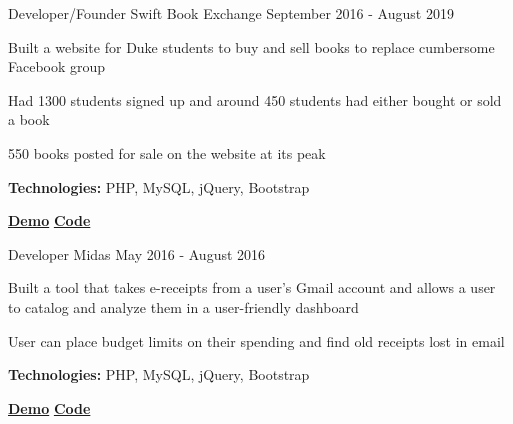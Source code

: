 
\begin{cventries}

  \cventry
    {Developer/Founder} %
    {Swift Book Exchange} %
    {} %
    {September 2016 - August 2019} %
    {
      \begin{cvitems} %
      	\item {Built a website for Duke students to buy and sell books to replace cumbersome Facebook group}
		\item {Had 1300 students signed up and around 450 students had either bought or sold a book}
		\item {550 books posted for sale on the website at its peak}
		{\setlength \itemindent{-2ex} \itemsep2pt \item[] \textbf{Technologies:} PHP, MySQL, jQuery, Bootstrap}
		{\setlength \itemindent{-2ex} \itemsep2pt \item[]  \href{https://sujaygarlanka.com/projects.html\#swift}{ \faPlayCircle \textbf{ Demo}} \href{https://github.com/sujaygarlanka/swift-book-exchange}{ \faGithub \textbf{ Code}}}
      \end{cvitems}
    }
    
 \cventry
    {Developer} %
    {Midas} %
    {} %
    {May 2016 - August 2016} %
    {
      \begin{cvitems} %
		\item {Built a tool that takes e-receipts from a user’s Gmail account and allows a user to catalog and
analyze them in a user-friendly dashboard}
        \item {User can place budget limits on their spending and find old receipts lost in email}
        {\setlength \itemindent{-2ex} \itemsep2pt \item[] \textbf{Technologies:} PHP, MySQL, jQuery, Bootstrap}
        {\setlength \itemindent{-2ex} \itemsep2pt \item[]  \href{https://sujaygarlanka.com/projects.html\#receipt}{ \faPlayCircle \textbf{ Demo}} \href{https://github.com/sujaygarlanka/receipt-database}{ \faGithub \textbf{ Code}}}
      \end{cvitems}
    }
\end{cventries}